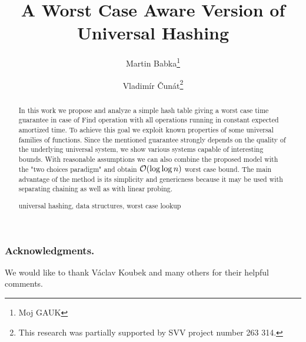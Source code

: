 \documentclass[runningheads,a4paper]{llncs}
\newcommand{\keywords}[1]{\par\addvspace\baselineskip
\noindent\keywordname\enspace\ignorespaces#1}
\begin{document}
\mainmatter

\author{Martin Babka\thanks{Moj GAUK} \and Vladimír Čunát\thanks{This research was partially supported by SVV project number 263 314.}}

\title{A Worst Case Aware Version of Universal Hashing}


\maketitle

\begin{abstract}
In this work we propose and analyze a simple hash table giving a worst case time guarantee in case of Find operation with all operations running in constant expected amortized time.
To achieve this goal we exploit known properties of some universal families of functions.
Since the mentioned guarantee strongly depends on the quality of the underlying universal system, we show various systems capable of interesting bounds.
With reasonable assumptions we can also combine the proposed model with the "two choices paradigm" and obtain $\mathcal{O}(\log \log n)$ worst case bound.
The main advantage of the method is its simplicity and genericness because it may be used with separating chaining as well as with linear probing.

\keywords{universal hashing, data structures, worst case lookup}
\end{abstract}






\subsubsection*{Acknowledgments.}
We would like to thank Václav Koubek and many others for their helpful comments.



\clearpage
% 


\end{document}
